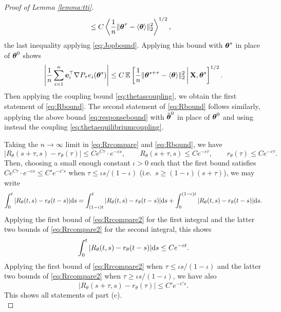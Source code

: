 \begin{proof}[Proof of Lemma \ref{lemma:tti}]
\begin{align}
&\leq C\left\langle \frac{1}{n}\|\boldsymbol{\theta}^\tau-\langle \boldsymbol{\theta}
\rangle\|_2^2 \right\rangle^{1/2}\label{eq:responsebound},
\end{align}
the last inequality applying \eqref{eq:Jopbound}.
Applying this bound with $\boldsymbol{\theta}^s$ in place of $\boldsymbol{\theta}^0$ shows
\[\left|\frac{1}{n}\sum_{i=1}^n \mathbf{e}_i^\top \nabla P_\tau e_i(\boldsymbol{\theta}^s)\right|
\leq C\,\mathbb{E}\left[\frac{1}{n}\|\boldsymbol{\theta}^{s+\tau}-\langle \boldsymbol{\theta}
\rangle\|_2^2 \,\bigg|\,\mathbf{X},\boldsymbol{\theta}^s\right]^{1/2}.\]
Then applying the coupling bound \eqref{eq:thetascoupling}, 
we obtain the first statement of
\eqref{eq:Rbound}. The second statement of \eqref{eq:Rbound}
follows similarly, applying the above
bound \eqref{eq:responsebound}
with $\tilde{\boldsymbol{\theta}}^0$ in place of $\boldsymbol{\theta}^0$ and using instead
the coupling \eqref{eq:thetaequilibriumcoupling}.

Taking the $n \to \infty$ limit in \eqref{eq:Rrcompare} and 
\eqref{eq:Rbound}, we have
\begin{equation}\label{eq:Rrcompare2}
|R_\theta(s+\tau,s)-r_\theta(\tau)| \leq Ce^{C\tau} \cdot e^{-cs},
\qquad R_\theta(s+\tau,s) \leq Ce^{-c\tau},
\qquad r_\theta(\tau) \leq Ce^{-c\tau}.
\end{equation}
Then, choosing a small enough constant $\iota>0$ such that the first bound
satisfies
$Ce^{C\tau} \cdot e^{-cs} \leq C'e^{-c's}$ when 
$\tau \leq \iota s/(1-\iota)$ (i.e.\ $s \geq (1-\iota)(s+\tau)$), we may write
\[\int_0^t |R_\theta(t,s)-r_\theta(t-s)| \mathrm{d} s
=\int_{(1-\iota)t}^t |R_\theta(t,s)-r_\theta(t-s)| \mathrm{d} s
+\int_0^{(1-\iota)t} |R_\theta(t,s)-r_\theta(t-s)| \mathrm{d} s.\]
Applying the first bound of \eqref{eq:Rrcompare2} for the first integral
and the latter two bounds of \eqref{eq:Rrcompare2} for the second integral,
this shows
\[\int_0^t |R_\theta(t,s)-r_\theta(t-s)| \mathrm{d} s \leq Ce^{-ct}.\]
Applying the first bound of \eqref{eq:Rrcompare2} when $\tau \leq \iota
s/(1-\iota)$ and the latter two bounds of \eqref{eq:Rrcompare2}
when $\tau \geq \iota s/(1-\iota)$, we have also
\[|R_\theta(s+\tau,s)-r_\theta(\tau)| \leq C'e^{-c's}.\]
This shows all statements of part (c).\\


\end{proof}
